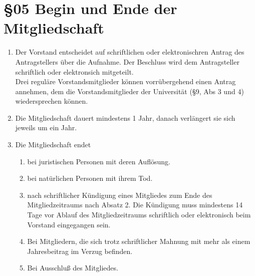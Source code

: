 \section*{§05 Begin und Ende der Mitgliedschaft}
\begin{enumerate}
\item Der Vorstand entscheidet auf schriftlichen oder elektronischren Antrag
des Antragstellers über die Aufnahme. Der Beschluss wird dem Antragsteller
schriftlich oder elektronsich mitgeteilt.\\
Drei reguläre Vorstandsmitglieder können vorrübergehend einen Antrag
annehmen, dem die Vorstandsmitglieder der Universität (§9, Abs 3 und
4) wiedersprechen können.
\item Die Mitgliedschaft dauert mindestens 1 Jahr, danach verlängert sie
sich jeweils um ein Jahr.
\item Die Mitgliedschaft endet

\begin{enumerate}
\item bei juristischen Personen mit deren Auflösung.
\item bei natürlichen Personen mit ihrem Tod.
\item nach schriftlicher Kündigung eines Mitgliedes zum Ende des Mitgliedzeitraums
nach Absatz 2. Die Kündigung muss mindestens 14 Tage vor Ablauf des
Mitgliedzeitraums schriftlich oder elektronisch beim Vorstand eingegangen
sein.
\item Bei Mitgliedern, die sich trotz schriftlicher Mahnung mit mehr als
einem Jahresbeitrag im Verzug befinden.
\item Bei Ausschluß des Mitgliedes.
\end{enumerate}
\end{enumerate}